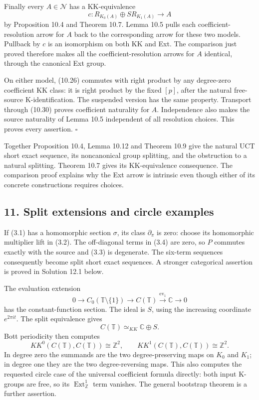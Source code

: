\documentclass[
  11pt,
]{article}
\begin{document}
Finally every \(A\in\mathcal N\) has a KK-equivalence \[
c:R_{K_0(A)}\oplus SR_{K_1(A)}\longrightarrow A
\tag{10.30}
\] by Proposition 10.4 and Theorem 10.7. Lemma 10.5 pulls each
coefficient-resolution arrow for \(A\) back to the corresponding arrow
for these two models. Pullback by \(c\) is an isomorphism on both KK and
Ext. The comparison just proved therefore makes all the
coefficient-resolution arrows for \(A\) identical, through the canonical
Ext group.

On either model, (10.26) commutes with right product by any degree-zero
coefficient KK class: it is right product by the fixed \([p]\), after
the natural free-source K-identification. The suspended version has the
same property. Transport through (10.30) proves coefficient naturality
for \(A\). Independence also makes the source naturality of Lemma 10.5
independent of all resolution choices. This proves every assertion.
\(\square\)

Together Proposition 10.4, Lemma 10.12 and Theorem 10.9 give the natural
UCT short exact sequence, its noncanonical group splitting, and the
obstruction to a natural splitting. Theorem 10.7 gives its
KK-equivalence consequence. The comparison proof explains why the Ext
arrow is intrinsic even though either of its concrete constructions
requires choices.

\subsection{11. Split extensions and circle
examples}\label{split-extensions-and-circle-examples}

If (3.1) has a homomorphic section \(\sigma\), its class
\(\partial_\pi\) is zero: choose its homomorphic multiplier lift in
(3.2). The off-diagonal terms in (3.4) are zero, so \(P\) commutes
exactly with the source and (3.3) is degenerate. The six-term sequences
consequently become split short exact sequences. A stronger categorical
assertion is proved in Solution 12.1 below.

The evaluation extension \[
0\longrightarrow C_0(\mathbb T\setminus\{1\})
\longrightarrow C(\mathbb T)
\xrightarrow{\operatorname{ev}_1}\mathbb C
\longrightarrow0
\tag{11.1}
\] has the constant-function section. The ideal is \(S\), using the
increasing coordinate \(e^{2\pi it}\). The split equivalence gives \[
C(\mathbb T)\simeq_{KK}\mathbb C\oplus S.
\tag{11.2}
\] Bott periodicity then computes \[
KK^0(C(\mathbb T),C(\mathbb T))\cong\mathbb Z^2,
\qquad
KK^1(C(\mathbb T),C(\mathbb T))\cong\mathbb Z^2.
\tag{11.3}
\] In degree zero the summands are the two degree-preserving maps on
\(K_0\) and \(K_1\); in degree one they are the two degree-reversing
maps. This also computes the requested circle case of the universal
coefficient formula directly: both input K-groups are free, so its
\(\operatorname{Ext}^1_{\mathbb Z}\) term vanishes. The general
bootstrap theorem is a further assertion.
\end{document}
